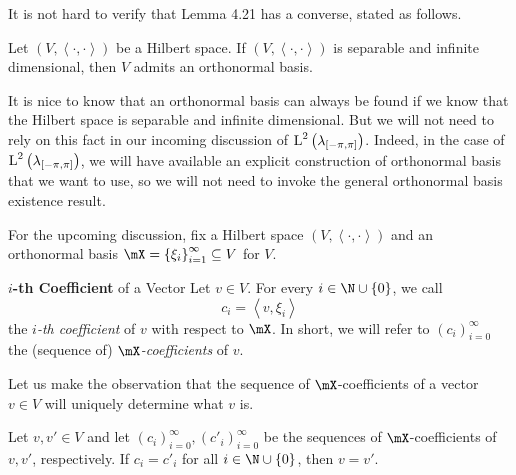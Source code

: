 \documentclass[pmath450]{subfiles}
\begin{document}
    \np It is not hard to verify that Lemma 4.21 has a converse, stated as follows.

    \begin{prop}{}
        Let $\left( V,\left\langle \cdot, \cdot\right\rangle \right)$ be a Hilbert space. If $\left( V,\left\langle \cdot, \cdot\right\rangle \right)$ is separable and infinite dimensional, then $V$ admits an orthonormal basis.
    \end{prop}

    \placeqed[Assignment!]
    
    \clearpage
    \np It is nice to know that an orthonormal basis can always be found if we know that the Hilbert space is separable and infinite dimensional. But we will not need to rely on this fact in our incoming discussion of $\operatorname{L}^{2}\left( \lambda_{\left[ -\pi,\pi \right]} \right)$. Indeed, in the case of $\operatorname{L}^{2}\left( \lambda_{\left[ -\pi,\pi \right]} \right)$, we will have available an explicit construction of orthonormal basis that we want to use, so we will not need to invoke the general orthonormal basis existence result.
    
    \np For the upcoming discussion, fix a Hilbert space $\left( V,\left\langle \cdot, \cdot\right\rangle \right)$ and an orthonormal basis $\mX = \left\lbrace \xi_i \right\rbrace^{\infty}_{i=1}\subseteq V$ for $V$.

    \begin{definition}{\textbf{$i$-th Coefficient} of a Vector}
        Let $v\in V$. For every $i\in\N\cup\left\lbrace 0 \right\rbrace$, we call
        \begin{equation*}
            c_i = \left\langle v, \xi_i\right\rangle
        \end{equation*}
        the \emph{$i$-th coefficient} of $v$ with respect to $\mX$. In short, we will refer to $\left( c_{i} \right)^{\infty}_{i=0}$ the (sequence of) \emph{$\mX$-coefficients} of $v$.
    \end{definition}
    
    \np Let us make the observation that the sequence of $\mX$-coefficients of a vector $v\in V$ will uniquely determine what $v$ is.

    \begin{prop}{}
        Let $v,v'\in V$ and let $\left( c_{i} \right)^{\infty}_{i=0},\left( c'_{i} \right)^{\infty}_{i=0}$ be the sequences of $\mX$-coefficients of $v,v'$, respectively. If $c_i=c'_i$ for all $i\in\N\cup\left\lbrace 0 \right\rbrace$, then $v=v'$.
    \end{prop}
\end{document}

